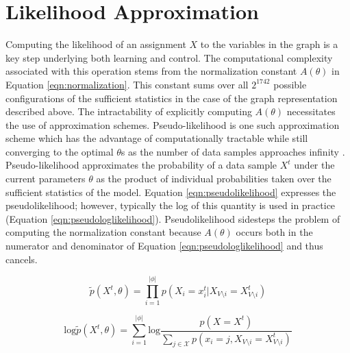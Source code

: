 \documentclass{article} %
\begin{document}
\section{Likelihood Approximation}
Computing the likelihood of an assignment $X$ to the variables in the graph is
a key step underlying both learning and control. The computational complexity
associated with this operation stems from the normalization constant
$A(\theta)$ in Equation \ref{eqn:normalization}. This constant sums over all
$2^{1742}$ possible configurations of the sufficient statistics in the case of
the graph representation described above. The intractability of explicitly
computing $A(\theta)$ necessitates the use of approximation schemes.
Pseudo-likelihood is one such approximation scheme which has the advantage of
computationally tractable while still converging to the optimal $\theta$s as
the number of data samples approaches infinity \cite{besag75}.
Pseudo-likelihood approximates the probability of a data sample $X^t$ under the
current parameters $\theta$ as the product of individual probabilities taken
over the sufficient statistics of the model. Equation
\ref{eqn:pseudolikelihood} expresses the pseudolikelihood; however, typically
the log of this quantity is used in practice (Equation
\ref{eqn:pseudologlikelihood}). Pseudolikelihood sidesteps the problem of
computing the normalization constant because $A(\theta)$ occurs both in the
numerator and denominator of Equation \ref{eqn:pseudologlikelihood} and thus
cancels.

\begin{equation}
\tilde{p}(X^t,\theta) = \prod_{i=1}^{|\phi|} p(X_i = x_i^t | X_{V\setminus i} = X_{V\setminus i}^t) 
\label{eqn:pseudolikelihood}
\end{equation}

\begin{equation}
\textrm{log}\tilde{p}(X^t,\theta) = \sum_{i=1}^{|\phi|} \textrm{log}\frac{p(X = X^t)}{\sum_{j \in \mathcal{X}} p(x_i = j, X_{V\setminus i} = X_{V\setminus i}^t)}
\label{eqn:pseudologlikelihood}
\end{equation}

\end{document}
